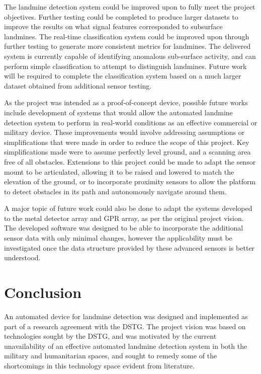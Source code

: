 \documentclass[main.tex]{subfiles}
\begin{document}
The landmine detection system could be improved upon to fully meet the project objectives. Further testing could be completed to produce larger datasets to improve the results on what signal features corresponded to subsurface landmines. The real-time classification system could be improved upon through further testing to generate more consistent metrics for landmines. The delivered system is currently capable of identifying anomalous sub-surface activity, and can perform simple classification to attempt to distinguish landmines. Future work will be required to complete the classification system based on a much larger dataset obtained from additional sensor testing. 


As the project was intended as a proof-of-concept device, possible future works include development of systems that would allow the automated landmine detection system to perform in real-world conditions as an effective commercial or military device. These improvements would involve addressing assumptions or simplifications that were made in order to reduce the scope of this project. Key simplifications made were to assume perfectly level ground, and a scanning area free of all obstacles. Extensions to this project could be made to adapt the sensor mount to be articulated, allowing it to be raised and lowered to match the elevation of the ground, or to incorporate proximity sensors to allow the platform to detect obstacles in its path and autonomously navigate around them.

A major topic of future work could also be done to adapt the systems developed to the metal detector array and GPR array, as per the original project vision. The developed software was designed to be able to incorporate the additional sensor data with only minimal changes, however the applicability must be investigated once the data structure provided by these advanced sensors is better understood.

\section{Conclusion}
An automated device for landmine detection was designed and implemented as part of a research agreement with the DSTG. 
The project vision was based on technologies sought by the DSTG, and was motivated by the current unavailability of an effective automated landmine detection system in both the military and humanitarian spaces, and sought to remedy some of the shortcomings in this technology space evident from literature.\\
\end{document}
